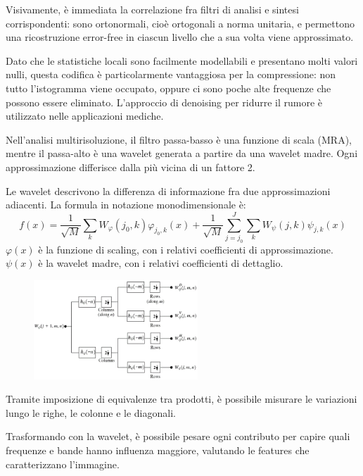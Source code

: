 Visivamente, è immediata la correlazione fra filtri di analisi e sintesi corrispondenti: sono ortonormali, cioè ortogonali a norma unitaria, e permettono una ricostruzione error-free in ciascun livello che a sua volta viene approssimato.

Dato che le statistiche locali sono facilmente modellabili e presentano molti valori nulli, questa codifica è particolarmente vantaggiosa per la compressione: non tutto l'istogramma viene occupato, oppure ci sono poche alte frequenze che possono essere eliminato. L'approccio di denoising per ridurre il rumore è utilizzato nelle applicazioni mediche.

Nell'analisi multirisoluzione, il filtro passa-basso è una funzione di scala (MRA), mentre il passa-alto è una wavelet generata a partire da una wavelet madre. Ogni approssimazione differisce dalla più vicina di un fattore 2.

Le wavelet descrivono la differenza di informazione fra due approssimazioni adiacenti. La formula in notazione monodimensionale è:
$$f(x)  = \frac{1}{\sqrt{M}} \sum_{k} W_\varphi (j_0, k) \varphi_{j_0, k} (x) + \frac{1}{\sqrt{M}} \sum_{j=j_0}^{J}\sum_{k} W_\psi(j, k)\psi_{j, k}(x)$$
$\varphi(x)$ è la funzione di scaling, con i relativi coefficienti di approssimazione. $\psi(x)$ è la wavelet madre, con i relativi coefficienti di dettaglio.

 \begin{figure}
	\vspace{-10pt}
	\includegraphics[width=0.55\textwidth]{Lezioni/Immagini/wct2}
	\vspace{-30pt}
\end{figure}

Tramite imposizione di equivalenze tra prodotti, è possibile misurare le variazioni lungo le righe, le colonne e le diagonali. 

Trasformando con la wavelet, è possibile pesare ogni contributo per capire quali frequenze e bande hanno influenza maggiore, valutando le features che caratterizzano l'immagine. 

